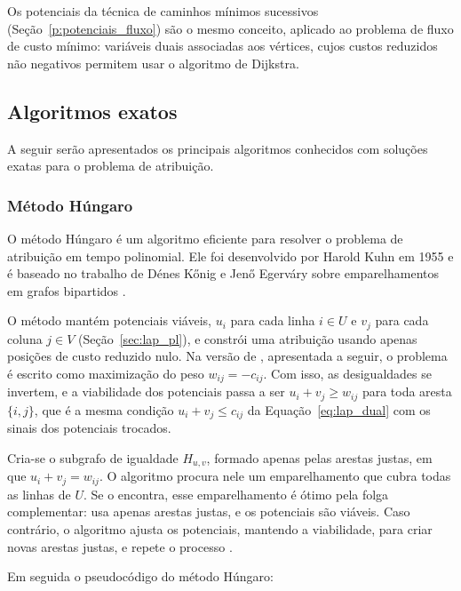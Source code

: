 Os potenciais da técnica de caminhos mínimos sucessivos (Seção~\ref{p:potenciais_fluxo}) são o mesmo conceito, aplicado ao problema de fluxo de custo mínimo: variáveis duais associadas aos vértices, cujos custos reduzidos não negativos permitem usar o algoritmo de Dijkstra.


\subsection{Algoritmos exatos}

A seguir serão apresentados os principais algoritmos conhecidos com soluções exatas para o problema de atribuição.

\subsubsection{Método Húngaro}

O método Húngaro é um algoritmo eficiente para resolver o problema de atribuição em tempo polinomial. Ele foi desenvolvido por Harold Kuhn em 1955 e é baseado no trabalho de Dénes Kőnig e Jenő Egerváry sobre emparelhamentos em grafos bipartidos \cite{jungnickel}.

O método mantém potenciais viáveis, $u_i$ para cada linha $i \in U$ e $v_j$ para cada coluna $j \in V$ (Seção~\ref{sec:lap_pl}), e constrói uma atribuição usando apenas posições de custo reduzido nulo. Na versão de , apresentada a seguir, o problema é escrito como maximização do peso $w_{ij} = -c_{ij}$. Com isso, as desigualdades se invertem, e a viabilidade dos potenciais passa a ser $u_i + v_j \geq w_{ij}$ para toda aresta $\{i, j\}$, que é a mesma condição $u_i + v_j \le c_{ij}$ da Equação~\eqref{eq:lap_dual} com os sinais dos potenciais trocados.

Cria-se o subgrafo de igualdade $H_{u,v}$, formado apenas pelas arestas justas, em que $u_i + v_j = w_{ij}$. O algoritmo procura nele um emparelhamento que cubra todas as linhas de $U$. Se o encontra, esse emparelhamento é ótimo pela folga complementar: usa apenas arestas justas, e os potenciais são viáveis. Caso contrário, o algoritmo ajusta os potenciais, mantendo a viabilidade, para criar novas arestas justas, e repete o processo \cite{jungnickel}.

Em seguida o pseudocódigo do método Húngaro:

